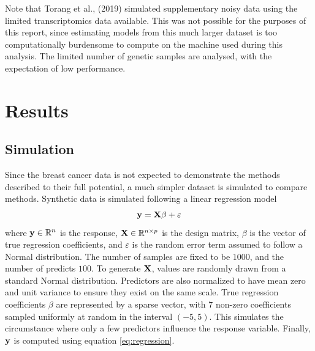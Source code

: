 \documentclass[
	a4paper, %
	10pt, %
	unnumberedsections, %
	twoside, %
]{LTJournalArticle}
\newcommand{\R}{\mathbb R}
\newcommand{\1}{\mathbbm{1}}
\begin{document}
Note that Torang et al., (2019) simulated supplementary noisy data using the limited transcriptomics data available. This was not possible for the purposes of this report, since estimating models from this much larger dataset is too computationally burdensome to compute on the machine used during this analysis. The limited number of genetic samples are analysed, with the expectation of low performance. 

\section{Results}


\subsection{Simulation}

Since the breast cancer data is not expected to demonstrate the methods described to their full potential, a much simpler dataset is simulated to compare methods. Synthetic data is simulated following a linear regression model
\begin{equation}
    \label{eq:regression}
    {\bf y} =  {\bf X} \beta + \varepsilon
\end{equation}
\noindent where $ {\bf y} \in \R^n$ is the response, $ {\bf X} \in \R^{n\times p}$ is the design matrix, $\beta$ is the vector of true regression coefficients, and $\varepsilon$ is the random error term assumed to follow a Normal distribution. The number of samples are fixed to be $1000$, and the number of predicts $100$. To generate ${\bf X}$, values are randomly drawn from a standard Normal distribution. Predictors are also normalized to have mean zero and unit variance to ensure they exist on the same scale. True regression coefficients $\beta$ are represented by a sparse vector, with 7 non-zero coefficients sampled uniformly at random in the interval $(-5, 5)$. This simulates the circumstance where only a few predictors influence the response variable. Finally, ${\bf y}$ is computed using equation \ref{eq:regression}. 
\end{document}
